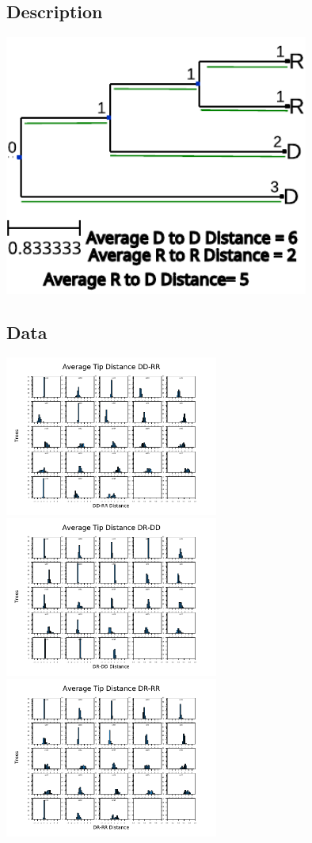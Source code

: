 \documentclass[10pt,aspectratio=169,notheorems,hyperref={pdfauthor=whatever}]{beamer}
\begin{document}
\subsection{Description}
\begin{frame}
  \centering
  \includegraphics[width=10cm, angle=0]{distexample}
 \end{frame}

\subsection{Data}
\begin{frame}
  \centering
  \includegraphics[width=7cm, angle=0]{dd_rr_distance}
  \includegraphics[width=7cm, angle=0]{dr_dd_distance}
  \includegraphics[width=7cm, angle=0]{dr_rr_distance}
\end{frame}
\end{document}
